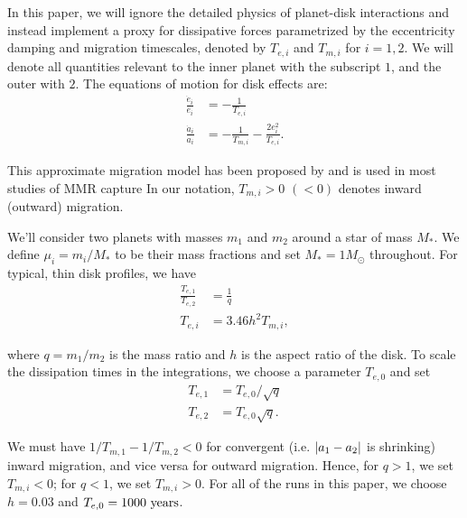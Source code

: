 \documentclass[usenatbib]{mnras}
\DeclarePairedDelimiter{\abs}{|}{|}
\begin{document}
In this paper, we will ignore the detailed physics of planet-disk
interactions and instead implement a proxy for dissipative forces
parametrized by the eccentricity damping and migration timescales,
denoted by \(T_{e,i}\) and \(T_{m,i}\) for \(i=1,2\).  We will denote all
quantities relevant to the inner planet with the subscript \(1\), and the
outer with \(2\).  The equations of motion for disk effects are:
\begin{align}\label{eq:disforce}
  \frac{\dot{e}_i}{e_i} &= -\frac{1}{T_{e,i}} \\
  \frac{\dot{a}_i}{a_i} &= -\frac{1}{T_{m,i}} -\frac{2e_i^2}{T_{e,i}}.
\end{align}

\noindent This approximate migration model has been proposed
by \citet{goldreich_disk-satellite_1980-1} and is used in most studies
of MMR capture
\cite[e.g.][]{goldreich_overstable_2014,xu_migration_2018} In our
notation, \(T_{m,i}>0\) \((<0)\) denotes inward (outward) migration.

We'll consider two planets with masses \(m_1\) and \(m_2\) around a star
of mass \(M_*\). We define \(\mu_i=m_i/M_*\) to be their mass fractions
and set \(M_*=1M_\odot\) throughout. For typical, thin disk profiles, we
have
\cite{tanaka_three-dimensional_2004,cresswell_three-dimensional_2008,xu_migration_2018}
\begin{align}
  \frac{T_{e,1}}{T_{e,2}}&= \frac1q\\
  T_{e,i}&=3.46 h^2 T_{m,i},
\end{align}

\noindent where \(q=m_1/m_2\) is the mass ratio and \(h\) is the
aspect ratio of the disk.  To scale the dissipation times in the
integrations, we choose a parameter \(T_{e,0}\) and set
\begin{align}
  T_{e,1}&=T_{e,0}/\sqrt{q}\\
  T_{e,2}&= T_{e,0}\sqrt{q}.
\end{align}

\noindent We must have \(1/T_{m,1} - 1/T_{m,2} < 0\) for
convergent (i.e. \(\abs{a_1-a_2}\) is shrinking) inward migration, and
vice versa for outward migration.  Hence, for \(q>1\), we set \(T_{m,i}<
0\); for \(q<1\), we set \(T_{m,i}>0\).  For all of the runs in this paper,
we choose \(h=0.03\) and \(T_{e,0}=1000~\rm{years}\).
\end{document}
